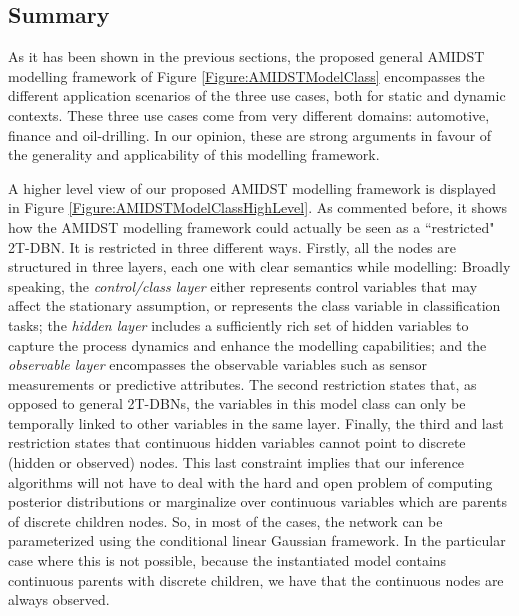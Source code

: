\subsection{Summary}\label{summaryAMIDSTModels}

As it has been shown in the previous sections, the proposed general AMIDST modelling framework of Figure \ref{Figure:AMIDSTModelClass} encompasses the different application scenarios of the three use cases, both for static and dynamic contexts. These three use cases come from very different domains: automotive, finance and oil-drilling. In our opinion, these are strong arguments in favour of the generality and applicability of this modelling framework. 

A higher level view of our proposed AMIDST modelling framework is displayed in Figure
\ref{Figure:AMIDSTModelClassHighLevel}. As commented before, it shows how the AMIDST modelling framework could actually
be seen as a ``restricted" 2T-DBN. It is restricted in three different ways. Firstly, all the nodes are structured in
three layers, each one with clear semantics while modelling: Broadly speaking, the \textit{control/class layer} either
represents control variables that may affect the stationary assumption, or represents the class variable in
classification tasks; the \textit{hidden layer} includes a sufficiently rich set of hidden variables to capture the
process dynamics and enhance the modelling capabilities; and the \textit{observable layer} encompasses the observable
variables such as sensor measurements or predictive attributes. The second restriction states that, as opposed to
general 2T-DBNs, the variables in this model class can only be temporally linked to other variables in the same
layer. Finally, the third and last restriction  states that continuous hidden variables cannot point to discrete (hidden
or observed) nodes. This last constraint implies that our inference algorithms will not have to deal with the hard and
open problem of computing posterior distributions or marginalize over continuous variables which are parents of discrete
children nodes. So, in most of the cases, the network can be parameterized using the conditional linear Gaussian
framework. In the particular case where this is not possible, because the instantiated model contains continuous parents
with discrete children, we have that the continuous nodes are always observed. 

